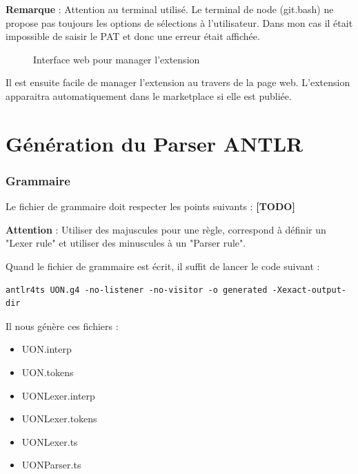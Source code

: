 \documentclass[
    iict, %
    il, %
]{heig-tb}
\begin{document}
\textbf{Remarque} : Attention au terminal utilisé. Le terminal de node (git.bash) ne propose pas toujours les options de sélections à l'utilisateur. Dans mon cas il était impossible de saisir le PAT et donc une erreur était affichée.

\begin{figure}[!h]
    \begin{center}
    \end{center}
    \caption[Interface web pour manager l'extension]{\label{manage-publisher} Interface web pour manager l'extension}
\end{figure}

Il est ensuite facile de manager l'extension au travers de la page web.
L'extension apparaitra automatiquement dans le marketplace si elle est publiée.


\section{Génération du Parser ANTLR}
\subsubsection{Grammaire}
Le fichier de grammaire doit respecter les points suivants : \textbf{[TODO]}

\textbf{Attention} : Utiliser des majuscules pour une règle, correspond à définir un "Lexer rule" et utiliser des minuscules à un  "Parser rule".

Quand le fichier de grammaire est écrit, il suffit de lancer le code suivant :

\begin{lstlisting}[frame=single]
    antlr4ts UON.g4 -no-listener -no-visitor -o generated -Xexact-output-dir
\end{lstlisting}

Il nous génère ces fichiers :
\begin{itemize}
    \item UON.interp
    \item UON.tokens
    \item UONLexer.interp
    \item UONLexer.tokens
    \item UONLexer.ts
    \item UONParser.ts
\end{itemize}
\end{document}
